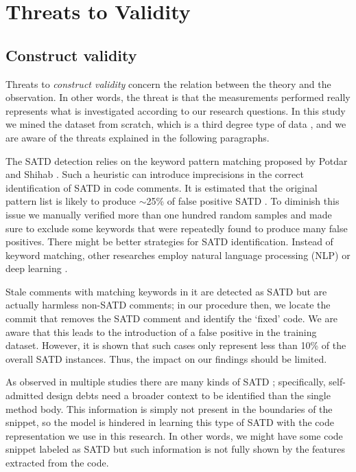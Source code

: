 \chapter{Threats to Validity}

\section{Construct validity}
Threats to \textit{construct validity} concern the relation between the theory and the observation. In other words, the threat is that the measurements performed really represents what is investigated according to our research questions. In this study we mined the dataset from scratch, which is a third degree type of data \cite{runeson2009guidelines}, and we are aware of the threats explained in the following paragraphs. 

The SATD detection relies on the keyword pattern matching proposed by Potdar and Shihab \cite{potdar2014exploratory}. Such a heuristic can introduce imprecisions in the correct identification of SATD in code comments. It is estimated that the original pattern list is likely to produce $\sim$25\% of false positive SATD \cite{bavota2016large}. To diminish this issue we manually verified more than one hundred random samples and made sure to exclude some keywords that were repeatedly found to produce many false positives.
There might be better strategies for SATD identification. Instead of keyword matching, other researches employ natural language processing (NLP) \cite{maldonado2017using} or deep learning \cite{wang2020detecting}. 

Stale comments with matching keywords in it are detected as SATD but are actually harmless non-SATD comments; in our procedure then, we locate the commit that removes the SATD comment and identify the `fixed' code. We are aware that this leads to the introduction of a false positive in the training dataset. However, it is shown \cite{bavota2016large} that such cases only represent less than 10\% of the overall SATD instances. Thus, the impact on our findings should be limited.

As observed in multiple studies there are many kinds of SATD \cite{alves2014towards} \cite{maldonado2015detecting}; specifically, self-admitted design debts need a broader context to be identified than the single method body. This information is simply not present in the boundaries of the snippet, so the model is hindered in learning this type of SATD with the code representation we use in this research. In other words, we might have some code snippet labeled as SATD but such information is not fully shown by the features extracted from the code.

